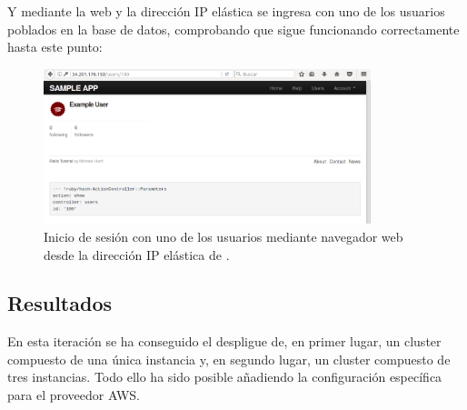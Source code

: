 Y mediante la web y la dirección IP elástica se ingresa con uno de los usuarios poblados en la base de datos, comprobando que sigue funcionando correctamente hasta este punto:

\begin{figure}[H]
\centering
\includegraphics[width=0.85\textwidth]{images/figures/skydns-web.png}
\caption{Inicio de sesión con uno de los usuarios mediante navegador web desde la dirección IP elástica de .\label{fig:figure_placement_example}}
\end{figure}


\subsection{Resultados}

En esta iteración se ha conseguido el despligue de, en primer lugar, un cluster compuesto de una única instancia y, en segundo lugar, un cluster compuesto de tres instancias. Todo ello ha sido posible añadiendo la configuración específica para el proveedor AWS.


